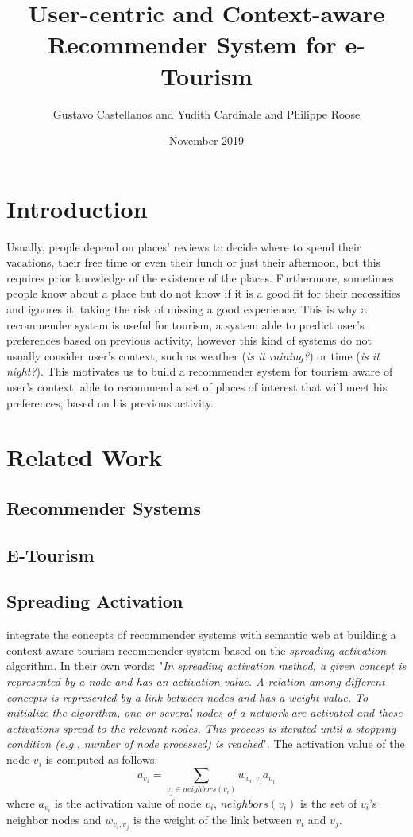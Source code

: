 \documentclass{article}
\title{User-centric and Context-aware  Recommender System for e-Tourism}
\author{Gustavo Castellanos and Yudith Cardinale and Philippe Roose }
\date{November 2019}
\begin{document}
\maketitle

\section{Introduction}
Usually, people depend on places' reviews to decide where to spend their vacations, their free time or even their lunch or just their afternoon, but this requires prior knowledge of the existence of the places. Furthermore, sometimes people know about a place but do not know if it is a good fit for their necessities and ignores it, taking the risk of missing a good experience. This is why a recommender system is useful for tourism, a system able to predict user's preferences based on previous activity, however this kind of systems do not usually consider user's context, such as weather (\textit{is it raining?}) or time (\textit{is it night?}). This motivates us to build a recommender system for tourism aware of user's context, able to recommend a set of places of interest that will meet his preferences, based on his previous activity.

\section{Related Work}
\subsection{Recommender Systems}
\subsection{E-Tourism}
\subsection{Spreading Activation}
\cite{bahramian_abbaspour_claramunt_2017} integrate the concepts of recommender systems with semantic web at building a context-aware tourism recommender system based on the \textit{spreading activation} algorithm. In their own words: "\textit{In spreading activation method, a given concept is represented by a node and has an activation value. A relation among different concepts is represented by a link between nodes and has a weight value. To initialize the algorithm, one or several nodes of a network are activated and these activations spread to the relevant nodes. This process is iterated until a stopping condition (e.g., number of node processed) is reached}". The activation value of the node \(v_i\) is computed as follows:
\begin{equation} \label{eq:og_activation}
a_{v_i} = \sum_{v_j \in neighbors(v_i)} w_{v_i, v_j} a_{v_j} 
\end{equation}
where $a_{v_i}$ is the activation value of node $v_i$, $neighbors(v_i)$ is the set of $v_i$'s neighbor nodes and $w_{v_i, v_j}$ is the weight of the link between $v_i$ and $v_j$.
\end{document}
